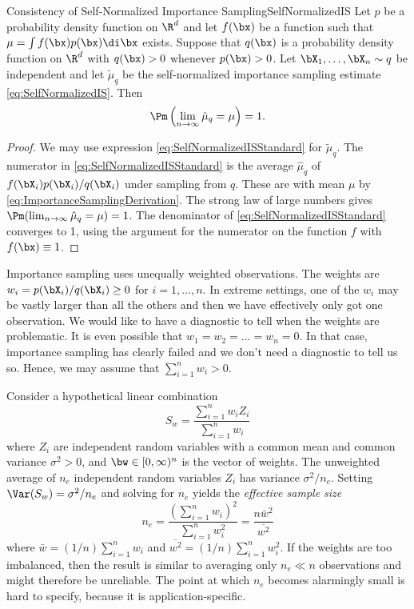 \begin{thm}{Consistency of Self-Normalized Importance Sampling}{SelfNormalizedIS}
	Let \(p\) be a probability density function on \(\R^d\) and let \(f(\bx)\) be a function such that \(\mu = \int f(\bx)p(\bx) \di \bx\) exists. Suppose that \(q(\bx)\) is a probability density function on \(\R^d\) with \(q(\bx) > 0\) whenever \(p(\bx) > 0\). Let \(\bX_1, \dots, \bX_n \sim q\) be independent and let \(\tilde{\mu}_q\) be the self-normalized importance sampling estimate \eqref{eq:SelfNormalizedIS}. Then
	\[
		\Pm \left( \lim_{n \to \infty} \tilde{\mu}_q = \mu \right) = 1.
	\]
\end{thm}

\begin{proof}
	We may use expression \eqref{eq:SelfNormalizedISStandard} for \(\tilde{\mu}_q\). The numerator in \eqref{eq:SelfNormalizedISStandard} is the average \(\hat{\mu}_q\) of \(f(\bX_i)p(\bX_i)/q(\bX_i)\) under sampling from \(q\). These are \iid with mean \(\mu\) by \eqref{eq:ImportanceSamplingDerivation}. The strong law of large numbers gives \(\Pm(\lim_{n \to \infty} \hat{\mu}_q = \mu) = 1\). The denominator of \eqref{eq:SelfNormalizedISStandard} converges to 1, using the argument for the numerator on the function \(f\) with \(f(\bx) \equiv 1\).
\end{proof}

Importance sampling uses unequally weighted observations. The weights are \(w_i = p(\bX_i)/q(\bX_i) \geq 0\) for \(i=1, \dots, n\). In extreme settings, one of the \(w_i\) may be vastly larger than all the others and then we have effectively only got one observation. We would like to have a diagnostic to tell when the weights are problematic. It is even possible that \(w_1 = w_2 = \dots = w_n = 0\). In that case, importance sampling has clearly failed and we don't need a diagnostic to tell us so. Hence, we may assume that \(\sum_{i=1}^n w_i > 0\).

Consider a hypothetical linear combination
\begin{equation}
	S_w = \frac{\sum_{i=1}^n w_i Z_i}{\sum_{i=1}^n w_i}
	\label{eq:HypotheticalLinearComb}
\end{equation}
where \(Z_i\) are independent random variables with a common mean and common variance \(\sigma^2 > 0\), and \(\bw \in [0, \infty)^n\) is the vector of weights. The unweighted average of \(n_e\) independent random variables \(Z_i\) has variance \(\sigma^2/n_e\). Setting \(\Var(S_w) = \sigma^2/n_e\) and solving for \(n_e\) yields the \textit{effective sample size}
\begin{equation}
	n_e = \frac{(\sum_{i=1}^n w_i)^2}{\sum_{i=1}^n w_i^2} = \frac{n \bar{w}^2}{\overline{w^2}}
	\label{eq:EffectiveSampleSize}
\end{equation}
where \(\bar{w} = (1/n) \sum_{i=1}^n w_i\) and \(\overline{w^2} = (1/n) \sum_{i=1}^n w_i^2\). If the weights are too imbalanced, then the result is similar to averaging only \(n_e \ll n\) observations and might therefore be unreliable. The point at which \(n_e\) becomes alarmingly small is hard to specify, because it is application-specific.

